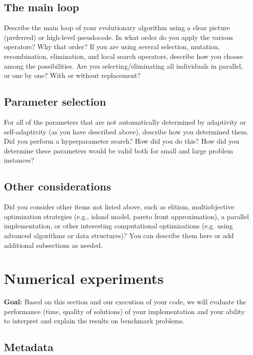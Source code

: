 \documentclass[a4paper,10pt]{article}
\newcommand{\ReplaceMe}[1]{{\color{blue}#1}}
\newcommand{\RemoveMe}[1]{{\color{purple}#1}}
\begin{document}
\subsection{The main loop}

\ReplaceMe{Describe the main loop of your evolutionary algorithm using a clear picture (preferred) or high-level pseudocode. In what order do you apply the various operators? Why that order? If you are using several selection, mutation, recombination, elimination, and local search operators, describe how you choose among the possibilities. Are you selecting/eliminating all individuals in parallel, or one by one? With or without replacement?}

\subsection{Parameter selection} \label{sec:hyperparameter}

\ReplaceMe{For all of the parameters that are not automatically determined by adaptivity or self-adaptivity (as you have described above), describe how you determined them. Did you perform a hyperparameter search? How did you do this? How did you determine these parameters would be valid both for small and large problem instances?}

\subsection{Other considerations}

\ReplaceMe{Did you consider other items not listed above, such as elitism, multiobjective optimization strategies (e.g., island model, pareto front approximation), a parallel implementation, or other interesting computational optimizations (e.g. using advanced algorithms or data structures)? You can describe them here or add additional subsections as needed.}


\section{Numerical experiments}

\RemoveMe{\textbf{Goal:} Based on this section and our execution of your code, we will evaluate the performance (time, quality of solutions) of your implementation and your ability to interpret and explain the results on benchmark problems.}

\subsection{Metadata}
\end{document}
